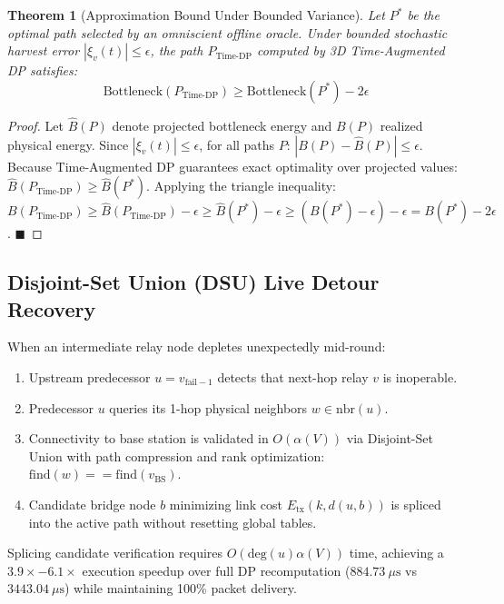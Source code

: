 \documentclass[conference]{IEEEtran}
\newtheorem{theorem}{Theorem}
\begin{document}
\begin{theorem}[Approximation Bound Under Bounded Variance]
Let $P^*$ be the optimal path selected by an omniscient offline oracle. Under bounded stochastic harvest error $|\xi_v(t)| \le \epsilon$, the path $P_{\text{Time-DP}}$ computed by 3D Time-Augmented DP satisfies:
\begin{equation}
\text{Bottleneck}(P_{\text{Time-DP}}) \ge \text{Bottleneck}(P^*) - 2\epsilon
\end{equation}
\end{theorem}
\begin{proof}
Let $\hat{B}(P)$ denote projected bottleneck energy and $B(P)$ realized physical energy. Since $|\xi_v(t)| \le \epsilon$, for all paths $P$: $|B(P) - \hat{B}(P)| \le \epsilon$. Because Time-Augmented DP guarantees exact optimality over projected values: $\hat{B}(P_{\text{Time-DP}}) \ge \hat{B}(P^*)$. Applying the triangle inequality:
$B(P_{\text{Time-DP}}) \ge \hat{B}(P_{\text{Time-DP}}) - \epsilon \ge \hat{B}(P^*) - \epsilon \ge (B(P^*) - \epsilon) - \epsilon = B(P^*) - 2\epsilon$. $\blacksquare$
\end{proof}

\subsection{Disjoint-Set Union (DSU) Live Detour Recovery}
When an intermediate relay node depletes unexpectedly mid-round:
\begin{enumerate}
    \item Upstream predecessor $u = v_{\text{fail}-1}$ detects that next-hop relay $v$ is inoperable.
    \item Predecessor $u$ queries its 1-hop physical neighbors $w \in \text{nbr}(u)$.
    \item Connectivity to base station is validated in $O(\alpha(V))$ via Disjoint-Set Union with path compression and rank optimization: $\text{find}(w) == \text{find}(v_{\text{BS}})$.
    \item Candidate bridge node $b$ minimizing link cost $E_{\text{tx}}(k, d(u, b))$ is spliced into the active path without resetting global tables.
\end{enumerate}
Splicing candidate verification requires $O(\text{deg}(u)\alpha(V))$ time, achieving a $3.9\times - 6.1\times$ execution speedup over full DP recomputation ($884.73\ \mu\text{s}$ vs $3443.04\ \mu\text{s}$) while maintaining 100\% packet delivery.
\end{document}
